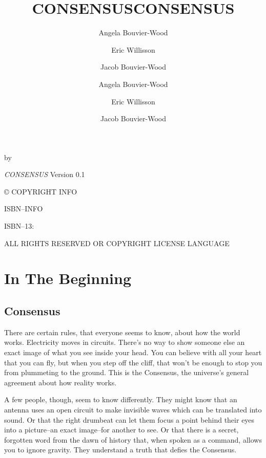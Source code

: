\documentclass[
  oneside,
  statementpaper,
  9pt]{memoir}
\title{CONSENSUS}
\author{Angela Bouvier-Wood \and Eric Willisson \and Jacob Bouvier-Wood}
\date{} %
\author{Angela Bouvier-Wood \and Eric Willisson \and Jacob Bouvier-Wood}
\title{CONSENSUS}
\date{}
\makeatletter
\def\maketitle{%
  \null
  \thispagestyle{empty}%
  \vfill
  \begin{center}\leavevmode
    \chapterfont
    {\HUGE\center \@title\par}%
\vskip 5cm
    \normalfont
    {\normalsize\center by}\par
    {\large\center \@author\par}%
    \vskip 1cm
  \end{center}%
  \vfill
  \null
  \cleardoublepage
  }
\makeatother
\begin{document}
\let\cleardoublepage\clearpage


\maketitle






\frontmatter

\null\vfill

\begin{flushleft}
\textit{CONSENSUS}
Version 0.1

© COPYRIGHT INFO


ISBN--INFO

ISBN--13: 
\bigskip





ALL RIGHTS RESERVED OR COPYRIGHT LICENSE LANGUAGE




\end{flushleft}
\let\cleardoublepage\clearpage

\mainmatter

{
\tableofcontents
}

\hypertarget{in-the-beginning}{%
\chapter{In The Beginning}\label{in-the-beginning}}

\hypertarget{consensus}{%
\section{Consensus}\label{consensus}}

There are certain rules, that everyone seems to know, about how the
world works. Electricity moves in circuits. There's no way to show
someone else an exact image of what you see inside your head. You can
believe with all your heart that you can fly, but when you step off the
cliff, that won't be enough to stop you from plummeting to the ground.
This is the Consensus, the universe's general agreement about how
reality works.

A few people, though, seem to know differently. They might know that an
antenna uses an open circuit to make invisible waves which can be
translated into sound. Or that the right drumbeat can let them focus a
point behind their eyes into a picture--an exact image--for another to
see. Or that there is a secret, forgotten word from the dawn of history
that, when spoken as a command, allows you to ignore gravity. They
understand a truth that defies the Consensus.
\end{document}

